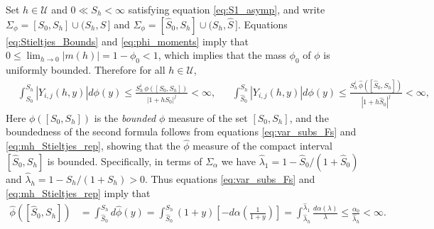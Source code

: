 \documentclass[english,12pt,jmp,graphicx]{revtex4-1}
\newcommand{\ph}{\hat{\phi}}
\begin{document}
Set $h\in\mathcal{U}$ and $0\ll S_h<\infty$ satisfying
equation \eqref{eq:S1_asymp}, and write $\Sigma_\phi=[S_0,S_h]\cup(S_h,S\,]$ and
$\Sigma_\phi=[\hat{S}_0,S_h]\cup(S_h,\hat{S}\,]$. Equations
\eqref{eq:Stieltjes_Bounds} and \eqref{eq:phi_moments} imply that
$0\leq\lim_{h\to0}|m(h)|=1-\phi_0<1$, which implies that the mass $\phi_0$ of $\phi$
is uniformly bounded. Therefore for all $h\in\mathcal{U}$,  
%
\begin{align*}%
  &\int_{S_0}^{S_h}|Y_{i,j}(h,y)| d\phi(y)\leq
  \frac{S_h^i\,\phi([S_0,S_h])}{|1+hS_0|^j}<\infty,
 &&
  \int_{\hat{S}_0}^{S_h}|Y_{i,j}(h,y)| d\phi(y)\leq
  \frac{S_h^i\,\ph([\hat{S}_0,S_h])}{|1+h\hat{S}_0|^j}<\infty,
\end{align*}
%
Here $\phi([S_0,S_h])$ is the \emph{bounded} $\phi$ measure of the set
$[S_0,S_h]$, and the boundedness of the second formula follows from
equations \eqref{eq:var_subs_Fs} and \eqref{eq:mh_Stieltjes_rep}, 
showing that the $\ph$ measure of the compact interval
$[\hat{S}_0,S_h]$ is bounded. Specifically, in terms of
$\Sigma_\alpha$ we have $\hat{\lambda}_1=1-\hat{S}_0/(1+\hat{S}_0)$ and
$\hat{\lambda}_h=1-S_h/(1+S_h)>0$. Thus equations
\eqref{eq:var_subs_Fs} and \eqref{eq:mh_Stieltjes_rep} imply that 
%
\begin{align*}%
  \ph([\hat{S}_0,S_h])&=\int_{\hat{S}_0}^{S_h}d\ph(y)
         =\int_{\hat{S}_0}^{S_h}(1+y)\left[-d\alpha\left(\frac{1}{1+y}\right)\right]
         =\int_{\hat{\lambda}_h}^{\hat{\lambda}_1}\frac{d\alpha(\lambda)}{\lambda}
         \leq\frac{\alpha_0}{\hat{\lambda}_h}<\infty.
\end{align*}
%
\end{document}
